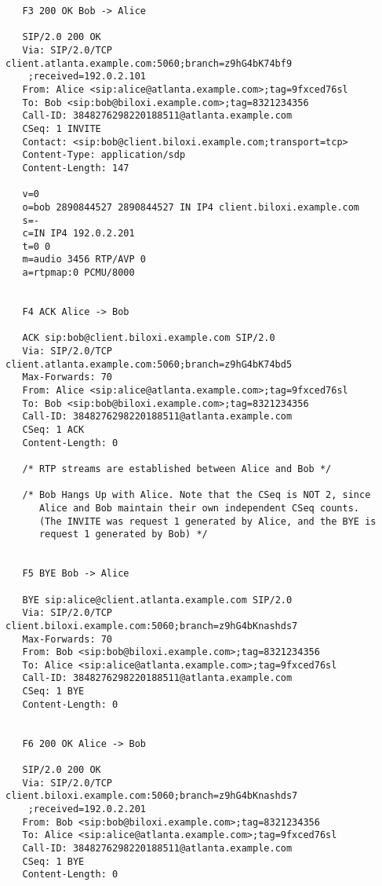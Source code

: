 \documentclass[a4paper,12pt]{report}
\newenvironment{myscriptlisting}
{\begin{list}{}{\setlength{\leftmargin}{1em}}\item\scriptsize\bfseries}
{\end{list}}
\begin{document}
\begin{myscriptlisting}
\begin{verbatim}
   F3 200 OK Bob -> Alice

   SIP/2.0 200 OK
   Via: SIP/2.0/TCP client.atlanta.example.com:5060;branch=z9hG4bK74bf9
    ;received=192.0.2.101
   From: Alice <sip:alice@atlanta.example.com>;tag=9fxced76sl
   To: Bob <sip:bob@biloxi.example.com>;tag=8321234356
   Call-ID: 3848276298220188511@atlanta.example.com
   CSeq: 1 INVITE
   Contact: <sip:bob@client.biloxi.example.com;transport=tcp>
   Content-Type: application/sdp
   Content-Length: 147

   v=0
   o=bob 2890844527 2890844527 IN IP4 client.biloxi.example.com
   s=-
   c=IN IP4 192.0.2.201
   t=0 0
   m=audio 3456 RTP/AVP 0
   a=rtpmap:0 PCMU/8000


   F4 ACK Alice -> Bob

   ACK sip:bob@client.biloxi.example.com SIP/2.0
   Via: SIP/2.0/TCP client.atlanta.example.com:5060;branch=z9hG4bK74bd5
   Max-Forwards: 70
   From: Alice <sip:alice@atlanta.example.com>;tag=9fxced76sl
   To: Bob <sip:bob@biloxi.example.com>;tag=8321234356
   Call-ID: 3848276298220188511@atlanta.example.com
   CSeq: 1 ACK
   Content-Length: 0

   /* RTP streams are established between Alice and Bob */

   /* Bob Hangs Up with Alice. Note that the CSeq is NOT 2, since
      Alice and Bob maintain their own independent CSeq counts.
      (The INVITE was request 1 generated by Alice, and the BYE is
      request 1 generated by Bob) */


   F5 BYE Bob -> Alice

   BYE sip:alice@client.atlanta.example.com SIP/2.0
   Via: SIP/2.0/TCP client.biloxi.example.com:5060;branch=z9hG4bKnashds7
   Max-Forwards: 70
   From: Bob <sip:bob@biloxi.example.com>;tag=8321234356
   To: Alice <sip:alice@atlanta.example.com>;tag=9fxced76sl
   Call-ID: 3848276298220188511@atlanta.example.com
   CSeq: 1 BYE
   Content-Length: 0


   F6 200 OK Alice -> Bob

   SIP/2.0 200 OK
   Via: SIP/2.0/TCP client.biloxi.example.com:5060;branch=z9hG4bKnashds7
    ;received=192.0.2.201
   From: Bob <sip:bob@biloxi.example.com>;tag=8321234356
   To: Alice <sip:alice@atlanta.example.com>;tag=9fxced76sl
   Call-ID: 3848276298220188511@atlanta.example.com
   CSeq: 1 BYE
   Content-Length: 0
\end{verbatim}
\end{myscriptlisting}
\cite{johnrfc3665}

\newpage
\end{document}
